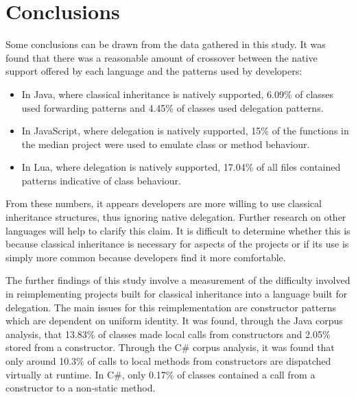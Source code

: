 \chapter{Conclusions}\label{C:con}
Some conclusions can be drawn from the data gathered in this study. It was found that there was a reasonable amount of crossover between the native support offered by each language and the patterns used by developers:
\begin{itemize}
	\item In Java, where classical inheritance is natively supported, 6.09\% of classes used forwarding patterns and 4.45\% of classes used delegation patterns.
	\item In JavaScript, where delegation is natively supported, 15\% of the functions in the median project were used to emulate class or method behaviour.
	\item In Lua, where delegation is natively supported, 17.04\% of all files contained patterns indicative of class behaviour.
\end{itemize}
From these numbers, it appears developers are more willing to use classical inheritance structures, thus ignoring native delegation. Further research on other languages will help to clarify this claim. It is difficult to determine whether this is because classical inheritance is necessary for aspects of the projects or if its use is simply more common because developers find it more comfortable.
\newline

The further findings of this study involve a measurement of the difficulty involved in reimplementing projects built for classical inheritance into a language built for delegation. The main issues for this reimplementation are constructor patterns which are dependent on uniform identity. It was found, through the Java corpus analysis, that 13.83\% of classes made local calls from constructors and 2.05\% stored  from a constructor. Through the C\# corpus analysis, it was found that only around 10.3\% of calls to local methods from constructors are dispatched virtually at runtime. In C\#, only 0.17\% of classes contained a call from a constructor to a non-static method.
